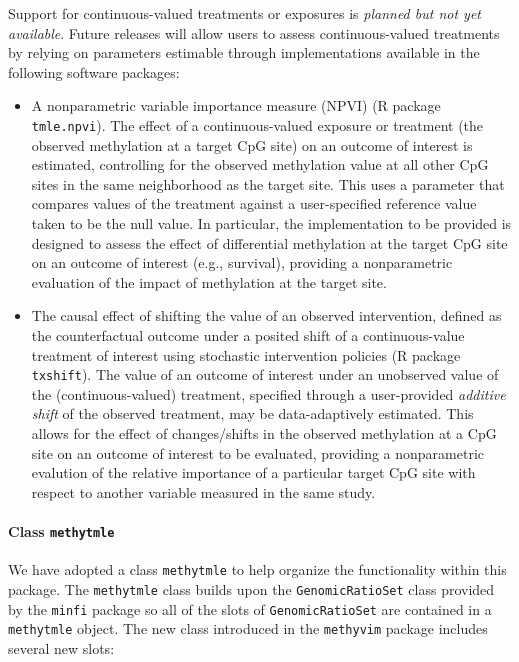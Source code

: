 \documentclass[9pt,a4paper,]{extarticle}
\theoremstyle{definition}
\theoremstyle{definition}
\theoremstyle{definition}
\theoremstyle{remark}
\begin{document}
Support for continuous-valued treatments or exposures is \emph{planned but not yet
available}. Future releases will allow users to assess continuous-valued
treatments by relying on parameters estimable through implementations available
in the following software packages:

\begin{itemize}
\item
  A nonparametric variable importance measure (NPVI) \citep{chambaz2012estimation}
  (R package \texttt{tmle.npvi}). The effect of a continuous-valued exposure or
  treatment (the observed methylation at a target CpG site) on an outcome of
  interest is estimated, controlling for the observed methylation value at all
  other CpG sites in the same neighborhood as the target site. This uses a
  parameter that compares values of the treatment against a user-specified
  reference value taken to be the null value. In particular, the implementation
  to be provided is designed to assess the effect of differential methylation at
  the target CpG site on an outcome of interest (e.g., survival), providing a
  nonparametric evaluation of the impact of methylation at the target site.
\item
  The causal effect of shifting the value of an observed intervention, defined
  as the counterfactual outcome under a posited shift of a continuous-value
  treatment of interest using stochastic intervention policies
  \citep[\citet{diaz2018stochastic}, \citet{hejazi2018txshift}]{munoz2012population} (R package
  \texttt{txshift}). The value of an outcome of interest under an unobserved value of
  the (continuous-valued) treatment, specified through a user-provided
  \emph{additive shift} of the observed treatment, may be data-adaptively estimated.
  This allows for the effect of changes/shifts in the observed methylation at a
  CpG site on an outcome of interest to be evaluated, providing a nonparametric
  evalution of the relative importance of a particular target CpG site with
  respect to another variable measured in the same study.
\end{itemize}

\hypertarget{class-methytmle}{%
\paragraph{\texorpdfstring{Class \texttt{methytmle}}{Class methytmle}}\label{class-methytmle}}

We have adopted a class \texttt{methytmle} to help organize the functionality within
this package. The \texttt{methytmle} class builds upon the \texttt{GenomicRatioSet} class
provided by the \texttt{minfi} package so all of the slots of \texttt{GenomicRatioSet} are
contained in a \texttt{methytmle} object. The new class introduced in the \texttt{methyvim}
package includes several new slots:
\end{document}
